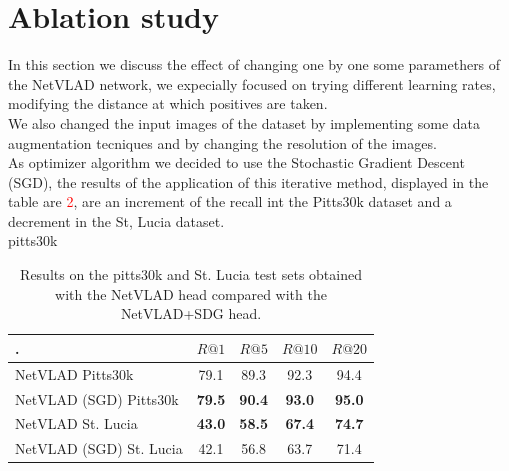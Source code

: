 \documentclass[10pt,twocolumn,letterpaper]{article}
\begin{document}
\section{Ablation study}
In this section we discuss the effect of changing one by one some paramethers of the NetVLAD network, we expecially focused on trying different learning rates, modifying the distance at which positives are taken.\\ We also changed the input images of the dataset by implementing some data augmentation tecniques and by changing the resolution of the images.\\
As optimizer algorithm we decided to use the Stochastic Gradient Descent (SGD), the results of the application of this iterative method, displayed in the table are \textcolor{red}{2}, are an increment of the recall int the Pitts30k dataset and a decrement in the St, Lucia dataset.\\
pitts30k
\begin{table}[!h]
	\centering
	\begin{tabular}{|l|c|c|c|c|}
		\hline
		.&        $R@1$   &        $R@5$   &        $R@10$  &        $R@20$   \\ \hline
		NetVLAD  Pitts30k     &         79.1   &         89.3   &          92.3   &          94.4   \\
		NetVLAD (SGD) Pitts30k  &         \textbf{79.5}   &         \textbf{90.4}   &          \textbf{93.0}   &          \textbf{95.0}   \\ \hline
		NetVLAD St. Lucia        &         \textbf{43.0}   &         \textbf{58.5}   &          \textbf{67.4}   &          \textbf{74.7}   \\
		NetVLAD (SGD) St. Lucia      &         42.1   & 56.8  &  63.7  &  71.4  \\
		 \hline
	\end{tabular}
	\caption{Results on the pitts30k and St. Lucia test sets obtained with the NetVLAD head compared with the NetVLAD+SDG head.}
	\label{tab:base_results}
\end{table}
\end{document}
